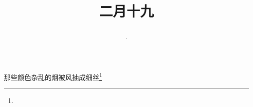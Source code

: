 \title{\date[d=28,m=3,y=2024][year:cn-y,年,month:cn,day:cn,日,·,weekday]·二月十九 }
那些颜色杂乱的烟被风抽成细丝\footnote{ }

